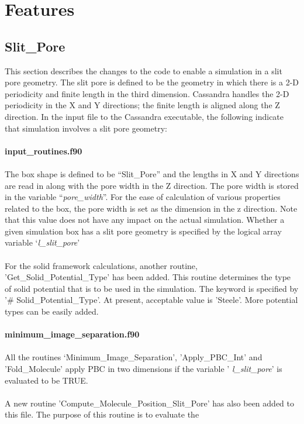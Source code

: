 \chapter{Features}

\section{Slit\_Pore} 
%
This section describes the changes to the code to enable a simulation
in a slit pore geometry. The slit pore is defined to be the geometry
in which there is a 2-D periodicity and finite length in the third 
dimension. Cassandra handles the 2-D periodicity in the X and Y directions;
the finite length is aligned along the Z direction. In the input file
to the Cassandra executable, the following indicate that simulation
involves a slit pore geometry: \\ \\
%
{\bf input\_routines.f90} \\ \\
%
The box shape is defined to be ``Slit\_Pore'' and the lengths in X and
Y directions are read in along with the pore width in the Z direction.
The pore width is stored in the variable ``{\em pore\_width}''. For the ease
of calculation of various properties related to the box, the pore width
is set as the dimension in the z direction. Note that
this value does not have any impact on the actual simulation. 
Whether a given simulation box has a slit pore geometry is specified by
the logical array variable `{\em l\_slit\_pore}'\\ \\
%
For the solid framework calculations, another routine, 'Get\_Solid\_Potential\_Type'
has been added. This routine determines the type of solid potential that is to
be used in the simulation. The keyword is specified by '\# Solid\_Potential\_Type'.
At present, acceptable value is 'Steele'. More potential types can be easily added. \\ \\
%
{\bf minimum\_image\_separation.f90} \\ \\
%
All the routines `Minimum\_Image\_Separation', 'Apply\_PBC\_Int' and
'Fold\_Molecule' apply PBC in two dimensions if the variable '{\em
l\_slit\_pore}' is evaluated to be TRUE. \\ \\
%
A new routine 'Compute\_Molecule\_Position\_Slit\_Pore' has also been
added to this file. The purpose of this routine is to evaluate the
